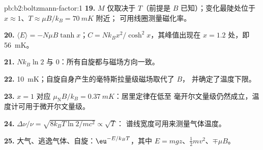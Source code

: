 \begin{solution}{pb:b2:boltzmann-factor:1}
\textbf{19.} $M$ 仅取决于 $T$（前提是 $B$ 已知）；变化最陡处位于
$x \approx 1$、$T \approx \mu B/k_B = \qty{70}{mK}$ 附近；
可用线圈测量磁化率。

\textbf{20.} $\langle E\rangle = -N\mu B\tanh x$；$C = Nk_Bx^2/\cosh^2x$，其峰值出现在
$x = 1.2$ 处，即 \qty{56}{mK}。

\textbf{21.} $Nk_B\ln 2$ 与 $0$：所有自旋都与磁场方向一致。

\textbf{22.} \qty{10}{mK}；自旋自身产生的毫特斯拉量级磁场取代了 $B$，
并确定了温度下限。

\textbf{23.} $x = 1$ 对应 $\mu_{\text{N}}B/k_B = \qty{0.37}{mK}$：居里定律在低至
毫开尔文量级仍然成立，温度计可用于微开尔文量级。

\textbf{24.} $\Delta\nu/\nu = \sqrt{8k_BT\ln2/mc^2} \propto \sqrt T$：
谱线宽度可用来测量气体温度。

\textbf{25.} 大气、逃逸气体、自旋：$\eu^{-E/k_BT}$，其中
$E = mgz$、$\tfrac12mv^2$、$\mp\mu B$。
\end{solution}
